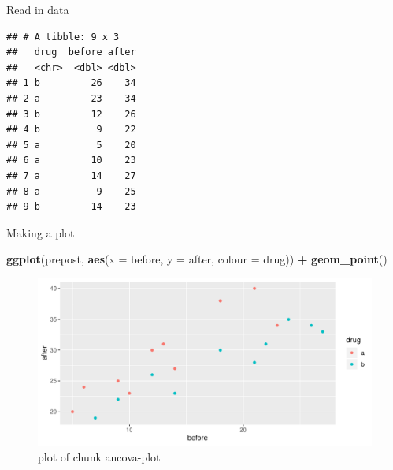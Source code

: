 \documentclass[ignorenonframetext,]{beamer}
\newenvironment{Shaded}{\begin{snugshade}}{\end{snugshade}}
\newcommand{\CommentTok}[1]{\textcolor[rgb]{0.56,0.35,0.01}{\textit{#1}}}
\newcommand{\DataTypeTok}[1]{\textcolor[rgb]{0.13,0.29,0.53}{#1}}
\newcommand{\DecValTok}[1]{\textcolor[rgb]{0.00,0.00,0.81}{#1}}
\newcommand{\KeywordTok}[1]{\textcolor[rgb]{0.13,0.29,0.53}{\textbf{#1}}}
\newcommand{\NormalTok}[1]{#1}
\newcommand{\OperatorTok}[1]{\textcolor[rgb]{0.81,0.36,0.00}{\textbf{#1}}}
\newcommand{\StringTok}[1]{\textcolor[rgb]{0.31,0.60,0.02}{#1}}
\begin{document}
\begin{frame}[fragile]{Read in data}
\protect\hypertarget{read-in-data-2}{}

\begin{Shaded}
\end{Shaded}

\begin{verbatim}
## # A tibble: 9 x 3
##   drug  before after
##   <chr>  <dbl> <dbl>
## 1 b         26    34
## 2 a         23    34
## 3 b         12    26
## 4 b          9    22
## 5 a          5    20
## 6 a         10    23
## 7 a         14    27
## 8 a          9    25
## 9 b         14    23
\end{verbatim}

\end{frame}

\begin{frame}[fragile]{Making a plot}
\protect\hypertarget{making-a-plot-1}{}

\begin{Shaded}
\begin{Highlighting}[]
\KeywordTok{ggplot}\NormalTok{(prepost, }\KeywordTok{aes}\NormalTok{(}\DataTypeTok{x =}\NormalTok{ before, }\DataTypeTok{y =}\NormalTok{ after, }\DataTypeTok{colour =}\NormalTok{ drug)) }\OperatorTok{+}
\StringTok{  }\KeywordTok{geom_point}\NormalTok{()}
\end{Highlighting}
\end{Shaded}

\begin{figure}
\centering
\includegraphics{figure/ancova-plot-1.pdf}
\caption{plot of chunk ancova-plot}
\end{figure}

\end{frame}
\end{document}
